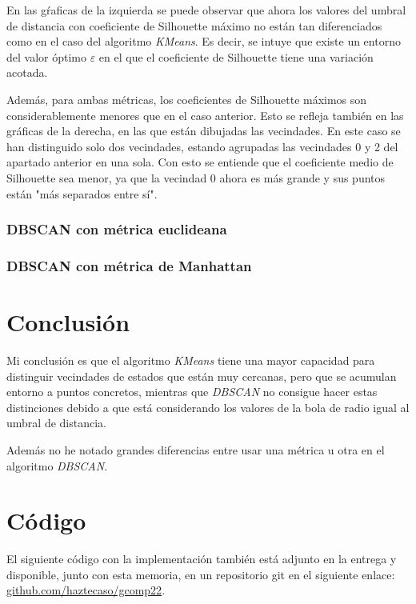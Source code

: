 \documentclass[10pt, spanish]{article}
\theoremstyle{definition}
\theoremstyle{break}
\begin{document}
En las gŕaficas de la izquierda se puede observar que ahora los valores del
umbral de distancia con coeficiente de Silhouette máximo no están tan
diferenciados como en el caso del algoritmo \textit{KMeans}. Es decir, se intuye
que existe un entorno del valor óptimo $\varepsilon$ en el que el coeficiente de
Silhouette tiene una variación acotada.

Además, para ambas métricas, los coeficientes de Silhouette máximos son
considerablemente menores que en el caso anterior. Esto se refleja también en
las gráficas de la derecha, en las que están dibujadas las vecindades. En este
caso se han distinguido solo dos vecindades, estando agrupadas las vecindades 0
y 2 del apartado anterior en una sola. Con esto se entiende que el coeficiente
medio de Silhouette sea menor, ya que la vecindad 0 ahora es más grande y sus 
puntos están "más separados entre sí".

\subsubsection{DBSCAN con métrica euclideana}
\begin{center}
    \vspace{-1em}
    \makebox[\textwidth][c]{\scalebox{0.65}{}}
\end{center}
\subsubsection{DBSCAN con métrica de Manhattan}
\vspace{-1em}
\begin{center}
    \makebox[\textwidth][c]{\scalebox{0.65}{}}
\end{center}

\section{Conclusión}

Mi conclusión es que el algoritmo \textit{KMeans} tiene una mayor capacidad para
distinguir vecindades de estados que están muy cercanas, pero que se acumulan
entorno a puntos concretos, mientras que \textit{DBSCAN} no consigue hacer estas
distinciones debido a que está considerando los valores de la bola de radio
igual al umbral de distancia.

Además no he notado grandes diferencias entre usar una métrica u otra en el
algoritmo \textit{DBSCAN}.

\section{Código}

El siguiente código con la implementación también está adjunto en la entrega
y disponible, junto con esta memoria, en un repositorio git en el siguiente
enlace:
\href{https://www.github.com/haztecaso/gcomp22}{github.com/haztecaso/gcomp22}.
\vspace{1em}


\end{document}
